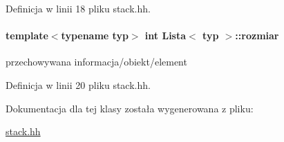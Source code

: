 Definicja w linii 18 pliku stack.\+hh.

\hypertarget{class_lista_a5b9d349b6ba27b55058ca77cb0909b6e}{}
\paragraph[{rozmiar}]{\setlength{\rightskip}{0pt plus 5cm}template$<$typename typ$>$ int {\bf Lista}$<$ typ $>$\+::rozmiar}\label{class_lista_a5b9d349b6ba27b55058ca77cb0909b6e}
przechowywana informacja/obiekt/element 

Definicja w linii 20 pliku stack.\+hh.



Dokumentacja dla tej klasy została wygenerowana z pliku\+:\begin{DoxyCompactItemize}
\item 
\hyperlink{stack_8hh}{stack.\+hh}\end{DoxyCompactItemize}
